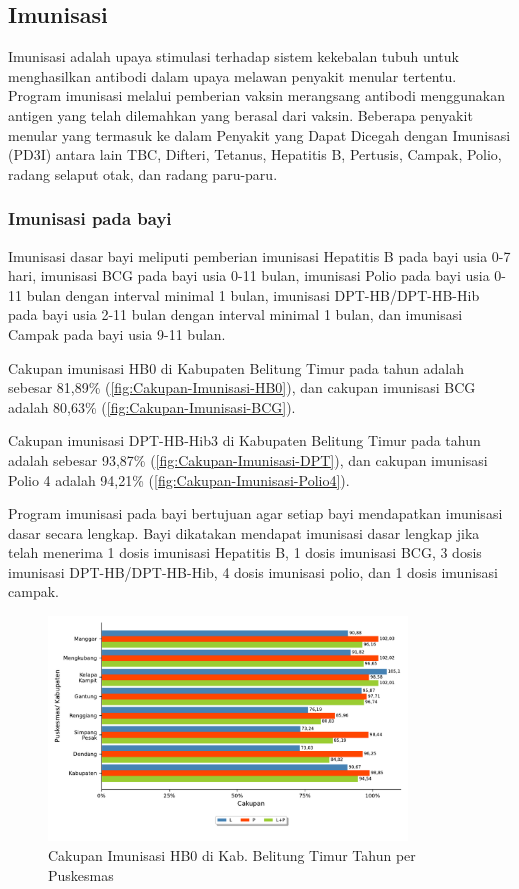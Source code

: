 \subsection{Imunisasi}
Imunisasi adalah upaya stimulasi terhadap sistem kekebalan tubuh untuk
menghasilkan antibodi dalam upaya melawan penyakit menular tertentu.
Program imunisasi melalui pemberian vaksin merangsang antibodi menggunakan
antigen yang telah dilemahkan yang berasal dari vaksin. Beberapa penyakit
menular yang termasuk ke dalam Penyakit yang Dapat Dicegah dengan
Imunisasi (PD3I) antara lain TBC, Difteri, Tetanus, Hepatitis B, Pertusis,
Campak, Polio, radang selaput otak, dan radang paru-paru.

\subsubsection{Imunisasi pada bayi}
Imunisasi dasar bayi meliputi pemberian imunisasi Hepatitis B pada
bayi usia 0-7 hari, imunisasi BCG pada bayi usia 0-11 bulan, imunisasi
Polio pada bayi usia 0-11 bulan dengan interval minimal 1 bulan, imunisasi
DPT-HB/DPT-HB-Hib pada bayi usia 2-11 bulan dengan interval minimal
1 bulan, dan imunisasi Campak pada bayi usia 9-11 bulan.

Cakupan imunisasi HB0 di Kabupaten Belitung Timur pada tahun \tP adalah sebesar 81,89\% (\autoref{fig:Cakupan-Imunisasi-HB0}), dan cakupan imunisasi BCG adalah 80,63\% (\autoref{fig:Cakupan-Imunisasi-BCG}).

Cakupan imunisasi DPT-HB-Hib3 di Kabupaten Belitung Timur pada tahun \tP
adalah sebesar 93,87\% (\autoref{fig:Cakupan-Imunisasi-DPT}), dan cakupan imunisasi Polio 4 adalah 94,21\% (\autoref{fig:Cakupan-Imunisasi-Polio4}).

Program imunisasi pada bayi bertujuan agar setiap bayi mendapatkan
imunisasi dasar secara lengkap. Bayi dikatakan mendapat imunisasi
dasar lengkap jika telah menerima 1 dosis imunisasi Hepatitis B, 1
dosis imunisasi BCG, 3 dosis imunisasi DPT-HB/DPT-HB-Hib, 4 dosis
imunisasi polio, dan 1 dosis imunisasi campak.

\begin{figure}[H]
    \centering
    \includegraphics[width=0.85\textwidth]{bab_05/bab_05_18a_imunHB0}
    \caption{Cakupan Imunisasi HB0 di Kab. Belitung Timur Tahun \tP per Puskesmas}
    \label{fig:Cakupan-Imunisasi-HB0}
\end{figure}

